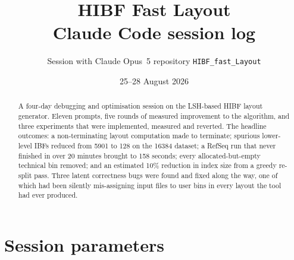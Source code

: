 \documentclass[11pt,a4paper]{article}
\title{\textbf{HIBF Fast Layout}\\[2pt]\large Claude Code session log}
\author{Session with Claude Opus~5 \textperiodcentered{} repository \texttt{HIBF\_fast\_Layout}}
\date{25--28 August 2026}
\begin{document}
\maketitle

\begin{abstract}
\noindent
A four-day debugging and optimisation session on the LSH-based HIBF layout generator. Eleven
prompts, five rounds of measured improvement to the algorithm, and three experiments that were
implemented, measured and reverted. The headline outcomes: a non-terminating layout computation
made to terminate; spurious lower-level IBFs reduced from 5901 to 128 on the 16384 dataset; a
RefSeq run that never finished in over 20 minutes brought to 158 seconds; every allocated-but-empty
technical bin removed; and an estimated 10\% reduction in index size from a greedy re-split pass.
Three latent correctness bugs were found and fixed along the way, one of which had been silently
mis-assigning input files to user bins in every layout the tool had ever produced.
\end{abstract}

\tableofcontents
\newpage

\section{Session parameters}
\end{document}
